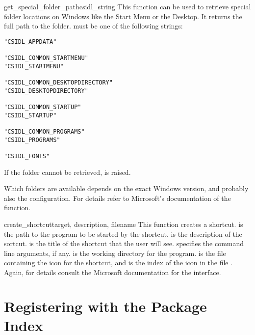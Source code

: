 \documentclass{manual}
\begin{document}
\begin{funcdesc}{get_special_folder_path}{csidl_string}
  This function can be used to retrieve special folder locations on
  Windows like the Start Menu or the Desktop.  It returns the full
  path to the folder.   must be one of the following
  strings:

\begin{verbatim}
"CSIDL_APPDATA"

"CSIDL_COMMON_STARTMENU"
"CSIDL_STARTMENU"

"CSIDL_COMMON_DESKTOPDIRECTORY"
"CSIDL_DESKTOPDIRECTORY"

"CSIDL_COMMON_STARTUP"
"CSIDL_STARTUP"

"CSIDL_COMMON_PROGRAMS"
"CSIDL_PROGRAMS"

"CSIDL_FONTS"
\end{verbatim}

  If the folder cannot be retrieved,  is raised.

  Which folders are available depends on the exact Windows version,
  and probably also the configuration.  For details refer to
  Microsoft's documentation of the
   function.
\end{funcdesc}

\begin{funcdesc}{create_shortcut}{target, description,
                                  filename}
  This function creates a shortcut.
   is the path to the program to be started by the shortcut.
   is the description of the sortcut.
   is the title of the shortcut that the user will see.
   specifies the command line arguments, if any.
   is the working directory for the program.
   is the file containing the icon for the shortcut,
  and  is the index of the icon in the file
  .  Again, for details consult the Microsoft
  documentation for the  interface.
\end{funcdesc}

\chapter{Registering with the Package Index}
\label{package-index}
\end{document}
